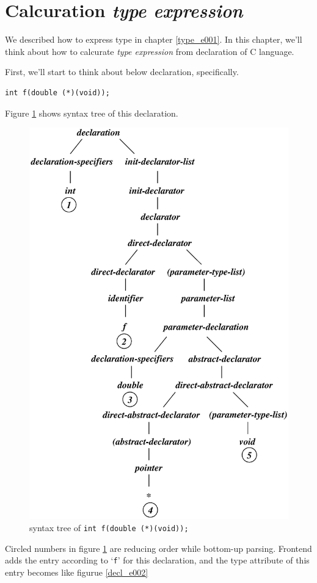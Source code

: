 \section{Calcuration {\em type expression}}
We described how to express type in chapter \ref{type_e001}.
In this chapter, we'll think about how to calcurate
{\em type expression} from declaration of C language.

First, we'll start to think about below declaration, specifically.
\begin{verbatim}
int f(double (*)(void));
\end{verbatim}
Figure \ref{decl_e001} shows syntax tree of this declaration.
\begin{figure}[htbp]
\begin{center}
\includegraphics[width=1.0125\linewidth,height=1.4175\linewidth]{decl001.eps}
\caption{syntax tree of {\tt{int f(double (*)(void));}}}
\label{decl_e001}
\end{center}
\end{figure}
Circled numbers in figure \ref{decl_e001} are reducing order
while bottom-up parsing. Frontend adds the entry according to `{\tt{f}}'
for this declaration, and the type attribute of this entry becomes
like figurue \ref{decl_e002}

